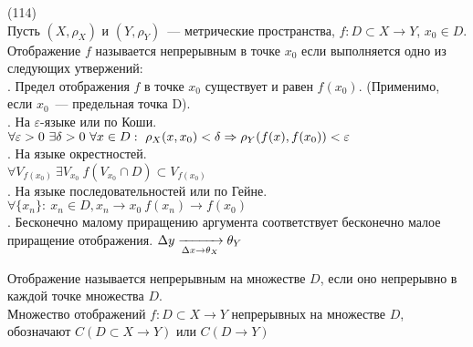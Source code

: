(114)\\
Пусть $(X, \rho_X)$ и $(Y, \rho_Y)$~--- метрические пространства, $f: D\subset X \to Y$, $x_0 \in D$. Отображение $f$ называется непрерывным в точке $x_0$ если выполняется одно из следующих утвержений:\\
. Предел отображения $f$ в точке $x_0$ существует и равен $f(x_0)$. (Применимо, если $x_0$~--- предельная точка D).\\
. \q На $\varepsilon$-языке или по Коши.\\
$\forall \varepsilon > 0\ \exists \delta > 0\ \forall x \in D:\ \rho_X(x, x_0) < \delta \Rightarrow \rho_Y(f(x), f(x_0)) < \varepsilon$\\
. \q На языке окрестностей.\\
$\forall V_{f(x_0)}\ \exists V_{x_0}\ f(V_{x_0} \cap D) \subset V_{f(x_0)}$\\
. \q На языке последовательностей или по Гейне.\\
$\forall \{x_n\}:\ x_n \in D, x_n \to x_0\ f(x_n) \to f(x_0)$\\
. Бесконечно малому приращению аргумента соответствует бесконечно малое приращение отображения. $\Delta y \xrightarrow[\Delta x \to \theta_X]{} \theta_Y$

Отображение называется непрерывным на множестве $D$, если оно непрерывно в каждой точке множества $D$.\\
Множество отображений $f: D\subset X \to Y$ непрерывных на множестве $D$, обозначают $C(D\subset X\to Y)$ или $C(D\to Y)$